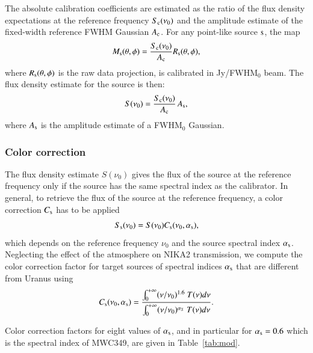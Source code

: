 The absolute calibration coefficients are estimated as the ratio of
the flux density expectations at the reference frequency
$S_{\rm{c}}(\nu_0)$ and the amplitude estimate of the fixed-width reference
FWHM Gaussian $A_{\rm{c}}$. For any point-like source $\rm{s}$, the map
\begin{equation}
  M_{\rm{s}}(\theta, \phi) = \frac{S_{\rm{c}} (\nu_{0})}{A_{\rm{c}}}
  R_{\rm{s}}(\theta,\phi),
\end{equation}
where $R_{\rm{s}}(\theta,\phi)$ is the raw data projection, is calibrated in Jy/FWHM$_{0}$
beam. The flux density estimate for the source is then:
\begin{equation}
S(\nu_{0})  = \frac{S_{\rm{c}}(\nu_{0})}{A_{\rm{c}}} \, A_{\rm{s}},
\label{eq:pointsourcephot}
\end{equation}
where $A_{\rm{s}}$ is the amplitude estimate of a FWHM$_0$ Gaussian.

\subsubsection{Color correction}

The flux density estimate $S(\nu_{0})$ gives the
flux of the source at the reference frequency only if the source has
the same spectral index as the calibrator. In general, to retrieve the
flux of the source at the reference frequency, a color correction
$C_{\rm{s}}$ has to be applied
\begin{equation}
S_{\rm{s}}(\nu_{0}) = S(\nu_{0})  C_{\rm{s}}(\nu_{0}, \alpha_{\rm{s}}),
\end{equation}
which depends on the reference frequency $\nu_{0}$ and the source
spectral index $\alpha_{\rm{s}}$.
Neglecting the effect of the atmosphere on NIKA2 transmission, we compute the color correction
factor for target sources of spectral indices $\alpha_{\rm{s}}$ that are
different from Uranus using
\begin{equation}
  C_{\rm{s}}(\nu_{0}, \alpha_{\rm{s}}) = \frac{\int_{0}^{+\infty} (\nu/\nu_0)^{1.6} ~T({\nu}) d\nu}{ \int_{0}^{+\infty} (\nu
    /\nu_0)^{\alpha_S} ~ T({\nu}) d\nu}.
\end{equation}

Color correction factors for eight values of $\alpha_{\rm{s}}$, and in particular
for $\alpha_{\rm{s}}= 0.6$ which is the spectral index of MWC349, are
given in Table~\ref{tab:mod}. 

